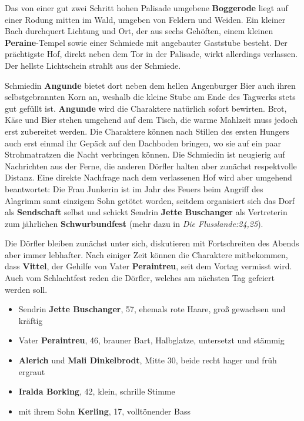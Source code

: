 Das von einer gut zwei Schritt hohen Palisade umgebene \textbf{Boggerode} liegt auf einer Rodung mitten im Wald, umgeben von Feldern und Weiden.
Ein kleiner Bach durchquert Lichtung und Ort, der aus sechs Gehöften, einem kleinen \textbf{Peraine}-Tempel sowie einer Schmiede mit angebauter Gaststube besteht.
Der prächtigste Hof, direkt neben dem Tor in der Palisade, wirkt allerdings verlassen.
Der hellste Lichtschein strahlt aus der Schmiede.
\begin{center}
\end{center}

Schmiedin \textbf{Angunde} bietet dort neben dem hellen Angenburger Bier auch ihren selbstgebrannten Korn an, weshalb die kleine Stube am Ende des Tagwerks stets gut gefüllt ist.
\textbf{Angunde} wird die Charaktere natürlich sofort bewirten.
Brot, Käse und Bier stehen umgehend auf dem Tisch, die warme Mahlzeit muss jedoch erst zubereitet werden.
Die Charaktere können nach Stillen des ersten Hungers auch erst einmal ihr Gepäck auf den Dachboden bringen, wo sie auf ein paar Strohmatratzen die Nacht verbringen können.
Die Schmiedin ist neugierig auf Nachrichten aus der Ferne, die anderen Dörfler halten aber zunächst respektvolle Distanz.
Eine direkte Nachfrage nach dem verlassenen Hof wird aber umgehend beantwortet:
Die Frau Junkerin ist im Jahr des Feuers beim Angriff des Alagrimm samt einzigem Sohn getötet worden, seitdem organisiert sich das Dorf als \textbf{Sendschaft} selbst und schickt Sendrin \textbf{Jette Buschanger} als Vertreterin zum jährlichen \textbf{Schwurbundfest} (mehr dazu in \emph{Die Flusslande:24,25}).


Die Dörfler bleiben zunächst unter sich, diskutieren mit Fortschreiten des Abends aber immer lebhafter.
Nach einiger Zeit können die Charaktere mitbekommen, dass \textbf{Vittel}, der Gehilfe von Vater \textbf{Peraintreu}, seit dem Vortag vermisst wird.
Auch vom Schlachtfest reden die Dörfler, welches am nächsten Tag gefeiert werden soll.

\begin{itemize}
	\item Sendrin \textbf{Jette Buschanger}, 57, ehemals rote Haare, groß gewachsen und kräftig
	\item Vater \textbf{Peraintreu}, 46, brauner Bart, Halbglatze, untersetzt und stämmig
	\item \textbf{Alerich} und \textbf{Mali Dinkelbrodt}, Mitte 30, beide recht hager und früh ergraut
	\item \textbf{Iralda Borking}, 42, klein, schrille Stimme
	\item mit ihrem Sohn \textbf{Kerling}, 17, volltönender Bass
\end{itemize}

